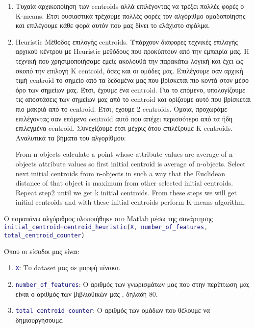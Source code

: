 \begin{enumerate}
    \item Τυχαία αρχικοποίηση των centroids αλλά επιλέγοντας να τρέξει πολλές φορές ο K-means. Έτσι ουσιαστικά τρέχουμε πολλές φορές τον αλγόριθμο ομαδοποίησης και επιλέγουμε κάθε φορά αυτόν που μας δίνει το ελάχιστο σφάλμα.

    \item Heuristic Μέθοδος επιλογής centroids.
    Υπάρχουν διάφορες τεχνικές επιλογής αρχικού κέντρου με Heuristic μεθόδους που προκύπτουν από την εμπειρία μας.
    Η τεχνική που χρησιμοποιήσαμε εμείς ακολουθά την παρακάτω λογική και έχει ως σκοπό την επιλογή Κ centroid, όσες και οι ομάδες μας.
    Επιλέγουμε σαν αρχική τιμή centroid το σημείο από τα δεδομένα μας που βρίσκεται πιο κοντά στον μέσο όρο των σημείων μας.
    Έτσι, έχουμε ένα centroid.
    Για το επόμενο, υπολογίζουμε τις αποστάσεις των σημείων μας από το centroid και ορίζουμε αυτό που βρίσκεται πιο μακριά από το centroid.
    Έτσι, έχουμε 2 centroids.
    Όμοια, προχωράμε επιλέγοντας σαν επόμενο centroid αυτό που απέχει περισσότερο από τα ήδη επιλεγμένα centroid.
    Συνεχίζουμε έτσι μέχρις ότου επιλέξουμε K centroids.
    Αναλυτικά τα βήματα του αλγορίθμου:\\
    \noindent\begin{minipage}{0.9\linewidth}
    \centering
    \begin{algorithm}[H]
        From n objects calculate a point whose attribute values are average of n-objects attribute values so first initial centroid is average of n-objects.\;
        Select next initial centroids from n-objects in such a way that the Euclidean distance of that object is maximum from other selected initial centroids.\;
        Repeat step2 until we get k initial centroids.
        From these steps we will get initial centroids and with these initial centroids perform K-means algorithm.\;
    \end{algorithm}
    \end{minipage}
\end{enumerate}

Ο παραπάνω αλγόριθμος υλοποιήθηκε στο Matlab μέσω της συνάρτησης
\lstinline[language=MATLAB]!initial_centroid=centroid_heuristic(X, number_of_features, total_centroid_counter)!

Όπου οι είσοδοι μας είναι:
\begin{enumerate}
    \item \lstinline[language=MATLAB]!X!: Το dataset μας σε μορφή πίνακα.
    \item \lstinline[language=MATLAB]!number_of_features!: Ο αριθμός των γνωρισμάτων μας που στην περίπτωση μας είναι ο αριθμός των βιβλιοθικών μας , δηλαδή 80.
    \item \lstinline[language=MATLAB]!total_centroid_counter!: Ο αριθμός των ομάδων που θέλουμε να δημιουργήσουμε.
\end{enumerate}

